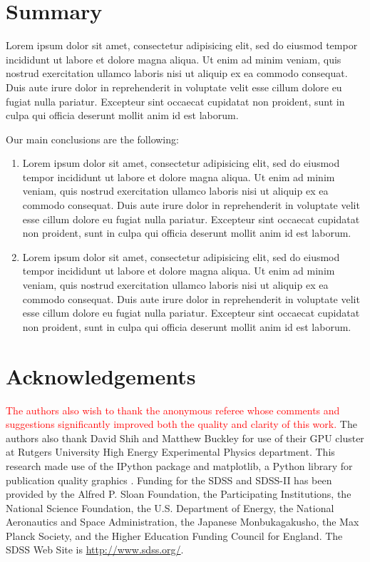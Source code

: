 \documentclass[fleqn,usenatbib]{mnras}
\newcommand{\editorial}[1]{\textcolor{red}{#1}}
\begin{document}
\section{Summary}\label{sec:summary}
Lorem ipsum dolor sit amet, consectetur adipisicing elit, sed do eiusmod tempor incididunt ut labore et dolore magna aliqua. Ut enim ad minim veniam, quis nostrud exercitation ullamco laboris nisi ut aliquip ex ea commodo consequat. Duis aute irure dolor in reprehenderit in voluptate velit esse cillum dolore eu fugiat nulla pariatur. Excepteur sint occaecat cupidatat non proident, sunt in culpa qui officia deserunt mollit anim id est laborum.

Our main conclusions are the following:
\begin{enumerate}
	\item Lorem ipsum dolor sit amet, consectetur adipisicing elit, sed do eiusmod tempor incididunt ut labore et dolore magna aliqua. Ut enim ad minim veniam, quis nostrud exercitation ullamco laboris nisi ut aliquip ex ea commodo consequat. Duis aute irure dolor in reprehenderit in voluptate velit esse cillum dolore eu fugiat nulla pariatur. Excepteur sint occaecat cupidatat non proident, sunt in culpa qui officia deserunt mollit anim id est laborum.

	\item Lorem ipsum dolor sit amet, consectetur adipisicing elit, sed do eiusmod tempor incididunt ut labore et dolore magna aliqua. Ut enim ad minim veniam, quis nostrud exercitation ullamco laboris nisi ut aliquip ex ea commodo consequat. Duis aute irure dolor in reprehenderit in voluptate velit esse cillum dolore eu fugiat nulla pariatur. Excepteur sint occaecat cupidatat non proident, sunt in culpa qui officia deserunt mollit anim id est laborum.
\end{enumerate}

\section*{Acknowledgements}
\editorial{The authors also wish to thank the anonymous referee whose comments and suggestions significantly improved both the quality and clarity of this work.}
The authors also thank David Shih and Matthew Buckley for use of their GPU cluster at Rutgers University High Energy Experimental Physics department. %
This research made use of the {\sc IPython} package \citep{Perez2007} and {\sc matplotlib}, a Python library for publication quality graphics \citep{Hunter2007}. Funding for the SDSS and SDSS-II has been provided by the Alfred P. Sloan Foundation, the Participating Institutions, the National Science Foundation, the U.S. Department of Energy, the National Aeronautics and Space Administration, the Japanese Monbukagakusho, the Max Planck Society, and the Higher Education Funding Council for England. The SDSS Web Site is \url{http://www.sdss.org/}.
\end{document}
